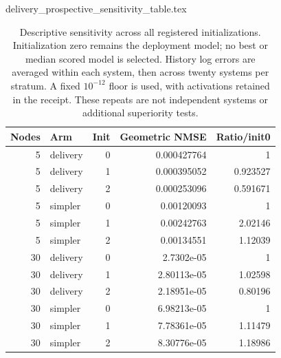 \begin{filecontents*}[overwrite]{delivery_prospective_sensitivity_table.tex}
\begin{table}[ht]
\centering\small
\begin{tabular}{rlrrr}
\toprule
Nodes & Arm & Init & Geometric NMSE & Ratio/init0\\
\midrule
5 & delivery & 0 & 0.000427764 & 1\\
5 & delivery & 1 & 0.000395052 & 0.923527\\
5 & delivery & 2 & 0.000253096 & 0.591671\\
5 & simpler & 0 & 0.00120093 & 1\\
5 & simpler & 1 & 0.00242763 & 2.02146\\
5 & simpler & 2 & 0.00134551 & 1.12039\\
30 & delivery & 0 & 2.7302e-05 & 1\\
30 & delivery & 1 & 2.80113e-05 & 1.02598\\
30 & delivery & 2 & 2.18951e-05 & 0.80196\\
30 & simpler & 0 & 6.98213e-05 & 1\\
30 & simpler & 1 & 7.78361e-05 & 1.11479\\
30 & simpler & 2 & 8.30776e-05 & 1.18986\\
\bottomrule
\end{tabular}
\caption{Descriptive sensitivity across all registered initializations. Initialization zero remains the deployment model; no best or median scored model is selected. History log errors are averaged within each system, then across twenty systems per stratum. A fixed $10^{-12}$ floor is used, with activations retained in the receipt. These repeats are not independent systems or additional superiority tests.}
\label{tab:prospective-init}
\end{table}
\end{filecontents*}
